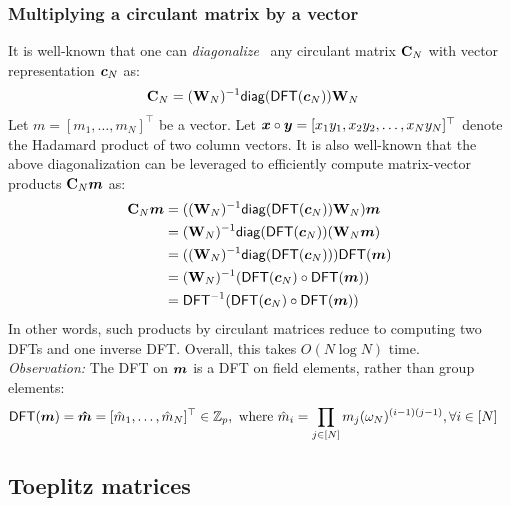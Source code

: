 \subsubsection{Multiplying a circulant matrix by a vector}
\label{s:circulant:diag-dft}
\label{s:circulant:multiply-vec}
It is well-known that one can \textit{diagonalize}~\cite{Diag20} any circulant matrix $\mathbf{C}_N$ with vector representation $\bm{c}_N$ as:
\begin{align}
    \mathbf{C}_N
     &= (\mathbf{W}_N)^{-1} \mathsf{diag}(\mathsf{DFT}(\bm{c}_N)) \mathbf{W}_N
\end{align}
Let $m=[m_1,\dots,m_N]^\top$ be a vector.
Let $\bm{x}\circ\bm{y} = [x_1 y_1, x_2 y_2,\dots, x_N y_N]^\top$ denote the Hadamard product of two column vectors.
It is also well-known that the above diagonalization can be leveraged to efficiently compute matrix-vector products $\mathbf{C}_N\bm{m}$ as:
\begin{align}
    \mathbf{C}_N \bm{m}
        &= ((\mathbf{W}_N)^{-1} \mathsf{diag}(\mathsf{DFT}(\bm{c}_N)) \mathbf{W}_N)\bm{m}\\
        &= (\mathbf{W}_N)^{-1} \mathsf{diag}(\mathsf{DFT}(\bm{c}_N)) (\mathbf{W}_N\bm{m})\\
        &= ((\mathbf{W}_N)^{-1} \mathsf{diag}(\mathsf{DFT}(\bm{c}_N))) \mathsf{DFT}(\bm{m})\\
        &= (\mathbf{W}_N)^{-1} (\mathsf{DFT}(\bm{c}_N)\circ \mathsf{DFT}(\bm{m}))\\
        &= \mathsf{DFT}^{-1}(\mathsf{DFT}(\bm{c}_N)\circ \mathsf{DFT}(\bm{m}))
\end{align}
In other words, such products by circulant matrices reduce to computing two DFTs and one inverse DFT.
Overall, this takes $O(N\log{N})$ time.
\\

\noindent\textit{Observation:} The DFT on $\bm{m}$ is a DFT on field elements, rather than group elements:
\begin{align}
    \mathsf{DFT}(\bm{m}) &= \bm{\hat{m}} = [\hat{m}_1, \dots, \hat{m}_N]^\top\in \mathbb{Z}_p,\ \text{where}\ \hat{m}_i= \prod_{j\in [N]} m_j (\omega_N)^{(i-1)(j-1)},\forall i\in[N]
\end{align}

\subsection{Toeplitz matrices}
\label{s:toeplitz}

